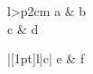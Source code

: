 \documentclass{article}
\begin{document}
\begin{longtabu}{l>{\centering}p{2cm}}
a & b \\
c & d \\
\end{longtabu}

\begin{longtabu}{|[1pt]l|c|}
e & f \\
\end{longtabu}
\end{document}
